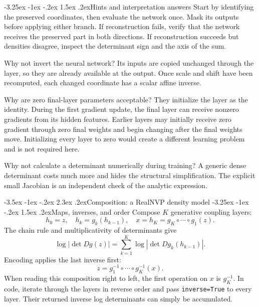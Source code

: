 \documentclass[11pt,a4paper]{article}
\makeatletter
\renewcommand\section{\@startsection{section}{1}{\z@}%
  {-3.5ex \@plus -1ex \@minus -.2ex}%
  {2.3ex \@plus .2ex}{\normalfont\Large}}
\renewcommand\subsection{\@startsection{subsection}{2}{\z@}%
  {-3.25ex \@plus -1ex \@minus -.2ex}%
  {1.5ex \@plus .2ex}{\normalfont\large}}
\makeatother
\begin{document}
\subsection{Hints and interpretation answers}
Start by identifying the preserved coordinates, then evaluate the network once.
Mask its outputs before applying either branch. If reconstruction fails,
verify that the network receives the preserved part in both directions.
If reconstruction succeeds but densities disagree, inspect the determinant
sign and the axis of the sum.

Why not invert the neural network? Its inputs are copied unchanged
through the layer, so they are already available at the output. Once scale
and shift have been recomputed, each changed coordinate has a scalar affine
inverse.

Why are zero final-layer parameters acceptable? They initialize the
layer as the identity. During the first gradient update, the final layer can
receive nonzero gradients from its hidden features. Earlier layers may
initially receive zero gradient through zero final weights and begin changing
after the final weights move. Initializing every layer to zero would create a
different learning problem and is not required here.

Why not calculate a determinant numerically during training? A generic
dense determinant costs much more and hides the structural simplification.
The explicit small Jacobian is an independent check of the analytic expression.

\section{Composition: a RealNVP density model}
\subsection{Maps, inverses, and order}
Compose $K$ generative coupling layers:
\[
 h_0=z,\quad h_k=g_k(h_{k-1}),\quad
 x=h_K=g_K\circ\cdots\circ g_1(z).
\]
The chain rule and multiplicativity of determinants give
\[
 \log|\det Dg(z)|
 =\sum_{k=1}^K\log|\det Dg_k(h_{k-1})|.
\]
Encoding applies the last inverse first:
\[
 z=g_1^{-1}\circ\cdots\circ g_K^{-1}(x).
\]
When reading this composition right to left, the first operation on $x$ is
$g_K^{-1}$. In code, iterate through the layers in reverse order and pass
\texttt{inverse=True} to every layer. Their returned inverse log determinants
can simply be accumulated.
\end{document}
